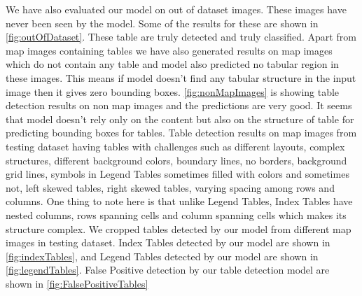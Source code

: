 We have also evaluated our model on out of dataset images. These images have never been seen by the model. Some of the results for these are shown in \autoref{fig:outOfDataset}. These table are truly detected and truly classified. Apart from map images containing tables we have also generated results on map images which do not contain any table and model also predicted no tabular region in these images. This means if model doesn't find any tabular structure in the input image then it gives zero bounding boxes. \autoref{fig:nonMapImages} is showing table detection results on non map images and the predictions are very good. It seems that model doesn't rely only on the content but also on the structure of table for predicting bounding boxes for tables. Table detection results on map images from testing dataset having tables with challenges such as different layouts, complex structures, different background colors, boundary lines, no borders, background grid lines, symbols in Legend Tables sometimes filled with colors and sometimes not, left skewed tables, right skewed tables, varying spacing among rows and columns. One thing to note here is that unlike Legend Tables, Index Tables have nested columns, rows spanning cells and column spanning cells which makes its structure complex. We cropped tables detected by our model from different map images in testing dataset. Index Tables detected by our model are shown in \autoref{fig:indexTables}, and Legend Tables detected by our model are shown in \autoref{fig:legendTables}. False Positive detection by our table detection model are shown in \autoref{fig:FalsePositiveTables}
